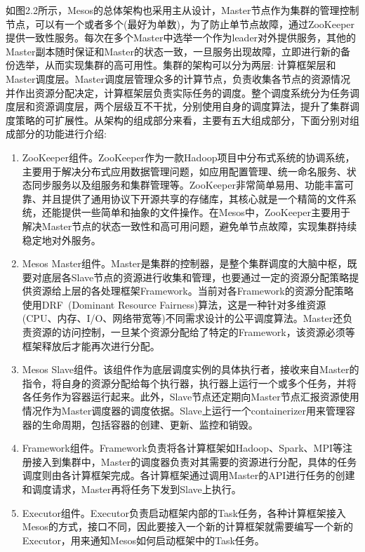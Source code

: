 如图2.2所示，Mesos的总体架构也采用主从设计，Master节点作为集群的管理控制节点，可以有一个或者多个(最好为单数)，为了防止单节点故障，通过ZooKeeper提供一致性服务。每次在多个Master中选举一个作为leader对外提供服务，其他的Master副本随时保证和Master的状态一致，一旦服务出现故障，立即进行新的备份选举，从而实现集群的高可用性。集群的架构可以分为两层: 计算框架层和Master调度层。Master调度层管理众多的计算节点，负责收集各节点的资源情况并作出资源分配决定，计算框架层负责实际任务的调度。整个调度系统分为任务调度层和资源调度层，两个层级互不干扰，分别使用自身的调度算法，提升了集群调度策略的可扩展性。从架构的组成部分来看，主要有五大组成部分，下面分别对组成部分的功能进行介绍:
\begin{enumerate}[1.]
	\item ZooKeeper组件。ZooKeeper作为一款Hadoop项目中分布式系统的协调系统，主要用于解决分布式应用数据管理问题，如应用配置管理、统一命名服务、状态同步服务以及组服务和集群管理等。ZooKeeper非常简单易用、功能丰富可靠、并且提供了通用协议下开源共享的存储库，其核心就是一个精简的文件系统，还能提供一些简单和抽象的文件操作。在Mesos中，ZooKeeper主要用于解决Master节点的状态一致性和高可用问题，避免单节点故障，实现集群持续稳定地对外服务。
	\item Mesos Master组件。Master是集群的控制器，是整个集群调度的大脑中枢，既要对底层各Slave节点的资源进行收集和管理，也要通过一定的资源分配策略提供资源给上层的各处理框架Framework。当前对各Framework的资源分配策略使用DRF~\cite{DRF2011}(Dominant Resource Fairness)算法，这是一种针对多维资源(CPU、内存、I/O、网络带宽等)不同需求设计的公平调度算法。Master还负责资源的访问控制，一旦某个资源分配给了特定的Framework，该资源必须等框架释放后才能再次进行分配。
	\item Mesos Slave组件。该组件作为底层调度实例的具体执行者，接收来自Master的指令，将自身的资源分配给每个执行器，执行器上运行一个或多个任务，并将各任务作为容器运行起来。此外，Slave节点还定期向Master节点汇报资源使用情况作为Master调度器的调度依据。Slave上运行一个containerizer用来管理容器的生命周期，包括容器的创建、更新、监控和销毁。
	\item Framework组件。Framework负责将各计算框架如Hadoop、Spark、MPI等注册接入到集群中，Master的调度器负责对其需要的资源进行分配，具体的任务调度则由各计算框架完成。各计算框架通过调用Master的API进行任务的创建和调度请求，Master再将任务下发到Slave上执行。
	\item Executor组件。Executor负责启动框架内部的Task任务，各种计算框架接入Mesos的方式，接口不同，因此要接入一个新的计算框架就需要编写一个新的Executor，用来通知Mesos如何启动框架中的Task任务。
\end{enumerate}

